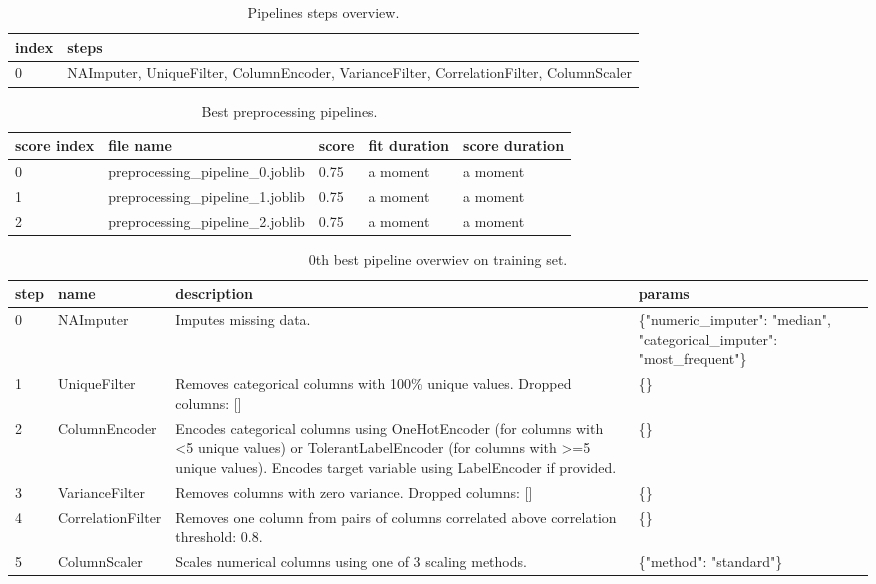 \documentclass{article}%
\begin{document}
%


\begin{table}[H]%
\begin{center}%
\begin{tabular}{p{20mm} p{160mm}}%
\hline%
\textbf{index}&\textbf{steps}\\%
\hline%
0&NAImputer, UniqueFilter, ColumnEncoder, VarianceFilter, CorrelationFilter, ColumnScaler\\%
\hline%
\end{tabular}%
\end{center}%
\caption{Pipelines steps overview.}%
\end{table}

%


\begin{table}[H]%
\begin{center}%
\begin{tabular}{l l l l l}%
\hline%
\textbf{score index}&\textbf{file name}&\textbf{score}&\textbf{fit duration}&\textbf{score duration}\\%
\hline%
0&preprocessing\_pipeline\_0.joblib&0.75&a moment&a moment\\%
1&preprocessing\_pipeline\_1.joblib&0.75&a moment&a moment\\%
2&preprocessing\_pipeline\_2.joblib&0.75&a moment&a moment\\%
\hline%
\end{tabular}%
\end{center}%
\caption{Best preprocessing pipelines.}%
\end{table}

%


\begin{table}[H]%
\begin{center}%
\begin{tabular}{p{10mm} p{30mm} p{60mm} p{60mm}}%
\hline%
\textbf{step}&\textbf{name}&\textbf{description}&\textbf{params}\\%
\hline%
0&NAImputer&Imputes missing data.&\{"numeric\_imputer": "median", "categorical\_imputer": "most\_frequent"\}\\%
1&UniqueFilter&Removes categorical columns with 100\% unique values. Dropped columns: {[}{]}&\{\}\\%
2&ColumnEncoder&Encodes categorical columns using OneHotEncoder (for columns with <5 unique values) or TolerantLabelEncoder (for columns with >=5 unique values). Encodes target variable using LabelEncoder if provided.&\{\}\\%
3&VarianceFilter&Removes columns with zero variance. Dropped columns: {[}{]}&\{\}\\%
4&CorrelationFilter&Removes one column from pairs of columns correlated above correlation threshold: 0.8.&\{\}\\%
5&ColumnScaler&Scales numerical columns using one of 3 scaling methods.&\{"method": "standard"\}\\%
\hline%
\end{tabular}%
\end{center}%
\caption{0th best pipeline overwiev on training set.}%
\end{table}
\end{document}
